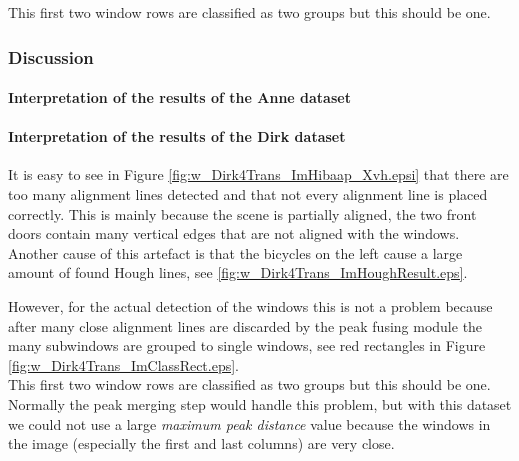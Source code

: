 


This first two window rows are classified as two groups but this should be one.\\



\subsubsection{Discussion}  %
\paragraph{Interpretation of the results of the Anne dataset}


\paragraph{Interpretation of the results of the Dirk dataset}
It is easy to see in Figure \ref{fig:w_Dirk4Trans_ImHibaap_Xvh.epsi} that there are 
too many alignment lines detected and that not every alignment line is placed correctly. 
This is mainly because the scene is partially aligned, the two
front doors contain many vertical edges that are not aligned with the windows.
Another cause of this artefact is that the bicycles on the left cause a large
amount of found Hough lines, see \ref{fig:w_Dirk4Trans_ImHoughResult.eps}.
 
However, for the actual detection of the windows this is not a problem because
after many close alignment lines are discarded by the peak fusing module the
many subwindows are grouped to single windows, see red rectangles in Figure
\ref{fig:w_Dirk4Trans_ImClassRect.eps}.\\


This first two window rows are classified as two groups but this should be one.
Normally the peak merging step would handle this problem, but with this dataset
we could not use a large \emph{maximum peak distance} value because the windows
in the image (especially the first and last columns) are very close.




